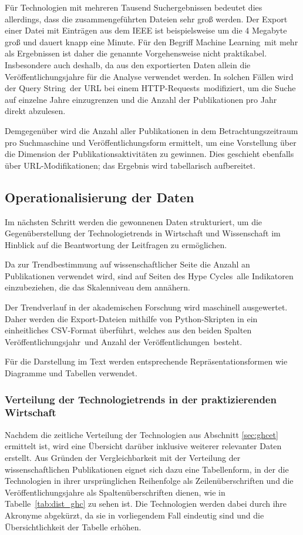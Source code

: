 Für Technologien mit mehreren Tausend Such\-ergebnissen bedeutet dies allerdings, dass die zusammengeführten Dateien sehr groß werden. Der Export einer Datei mit  Einträgen aus dem \ac{IEEE} ist beispielsweise um die 4 Megabyte groß und dauert knapp eine Minute. Für den Begriff \glqq Machine Learning\grqq~mit mehr als  Ergebnissen ist daher die genannte Vorgehensweise nicht praktikabel. Insbesondere auch deshalb, da aus den exportierten Daten allein die Veröffentlichungsjahre für die Analyse verwendet werden. In solchen Fällen wird der \glqq Query String\grqq~der \ac{URL} bei einem \glqq \acs{HTTP}-Requests\grqq~modifiziert, um die Suche auf einzelne Jahre einzugrenzen und die Anzahl der Publikationen pro Jahr direkt abzulesen.

Demgegenüber wird die Anzahl aller Publikationen in dem Betrachtungszeitraum pro Such\-maschine und Ver\-öf\-fent\-lich\-ungs\-form ermittelt, um eine Vorstellung über die Dimension der Pub\-li\-kations\-aktivitäten zu gewinnen. Dies geschieht ebenfalls über \ac{URL}-Modifikationen; das Ergebnis wird tabellarisch aufbereitet.

\subsection{Operationalisierung der Daten}
Im nächsten Schritt werden die gewonnenen Daten strukturiert, um die Gegenüberstellung der Technologietrends in Wirtschaft und Wissenschaft im Hinblick auf die Beantwortung der Leitfragen zu ermöglichen.

Da zur Trendbestimmung auf wissenschaftlicher Seite die Anzahl an Publikationen verwendet wird, sind auf Seiten des \glqq Hype Cycles\grqq~alle Indikatoren einzubeziehen, die das Skalenniveau dem annähern.

Der Trendverlauf in der akademischen Forschung wird maschinell ausgewertet. Daher werden die Export-Dateien mithilfe von Python-Skripten in ein einheitliches \acs{CSV}-Format überführt, welches aus den beiden Spalten \glqq Veröffentlichungsjahr\grqq~und \glqq Anzahl der Veröffentlichungen\grqq~besteht.

Für die Darstellung im Text werden entsprechende Repräsentationsformen wie Diagramme und Tabellen verwendet.

\subsubsection{Verteilung der Technologietrends in der praktizierenden Wirtschaft}
Nachdem die zeitliche Verteilung der Technologien aus Abschnitt \ref{sec:ghcet} ermittelt ist, wird eine Übersicht darüber inklusive weiterer relevanter Daten erstellt. Aus Gründen der Vergleichbarkeit mit der Verteilung der wissenschaftlichen Publikationen eignet sich dazu eine Tabellenform, in der die Technologien in ihrer ursprünglichen Reihenfolge als Zeilenüberschriften und die Veröffentlichungsjahre als Spaltenüberschriften dienen, wie in Tabelle~\ref{tab:dist_ghc} zu sehen ist. Die Technologien werden dabei durch ihre Akronyme abgekürzt, da sie in vorliegendem Fall eindeutig sind und die Übersichtlichkeit der Tabelle erhöhen.

